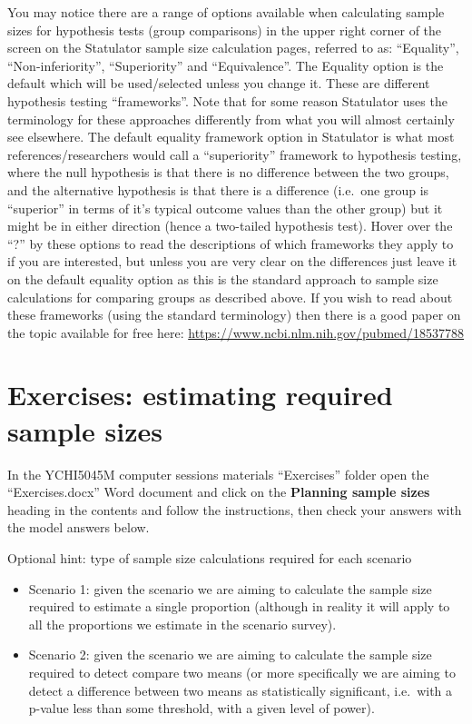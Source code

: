 \documentclass[
]{book}
\begin{document}
You may notice there are a range of options available when calculating sample sizes for hypothesis tests (group comparisons) in the upper right corner of the screen on the Statulator sample size calculation pages, referred to as: ``Equality'', ``Non-inferiority'', ``Superiority'' and ``Equivalence''. The Equality option is the default which will be used/selected unless you change it. These are different hypothesis testing ``frameworks''. Note that for some reason Statulator uses the terminology for these approaches differently from what you will almost certainly see elsewhere. The default equality framework option in Statulator is what most references/researchers would call a ``superiority'' framework to hypothesis testing, where the null hypothesis is that there is no difference between the two groups, and the alternative hypothesis is that there is a difference (i.e.~one group is ``superior'' in terms of it's typical outcome values than the other group) but it might be in either direction (hence a two-tailed hypothesis test). Hover over the ``?'' by these options to read the descriptions of which frameworks they apply to if you are interested, but unless you are very clear on the differences just leave it on the default equality option as this is the standard approach to sample size calculations for comparing groups as described above. If you wish to read about these frameworks (using the standard terminology) then there is a good paper on the topic available for free here: \url{https://www.ncbi.nlm.nih.gov/pubmed/18537788}

\hypertarget{exercises-estimating-required-sample-sizes}{%
\section{Exercises: estimating required sample sizes}\label{exercises-estimating-required-sample-sizes}}

In the YCHI5045M computer sessions materials ``Exercises'' folder open the ``Exercises.docx'' Word document and click on the \textbf{Planning sample sizes} heading in the contents and follow the instructions, then check your answers with the model answers below.

Optional hint: type of sample size calculations required for each scenario

\begin{itemize}
\item
  Scenario 1: given the scenario we are aiming to calculate the sample size required to estimate a single proportion (although in reality it will apply to all the proportions we estimate in the scenario survey).
\item
  Scenario 2: given the scenario we are aiming to calculate the sample size required to detect compare two means (or more specifically we are aiming to detect a difference between two means as statistically significant, i.e.~with a p-value less than some threshold, with a given level of power).
\end{itemize}
\end{document}
